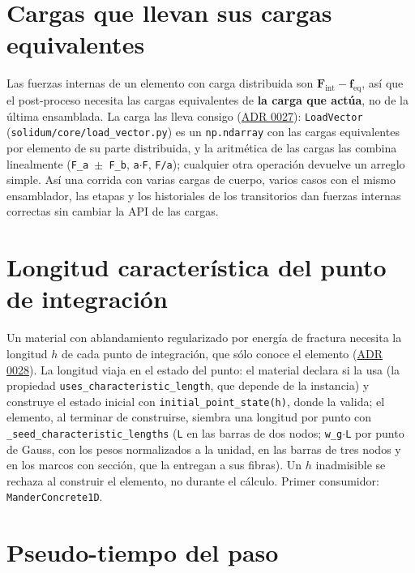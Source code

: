 \documentclass[11pt,oneside]{report}
\begin{document}
\section{Cargas que llevan sus cargas equivalentes}

Las fuerzas internas de un elemento con carga distribuida son $\mathbf F_\text{int} - \mathbf f_\text{eq}$, así que el post-proceso necesita las cargas equivalentes de \textbf{la carga que actúa}, no de la última ensamblada. La carga las lleva consigo (\hyperref[adr:0027]{ADR 0027}): \texttt{LoadVector} (\texttt{solidum/\allowbreak{}core/\allowbreak{}load\_\allowbreak{}vector.\allowbreak{}py}) es un \texttt{np.ndarray} con las cargas equivalentes por elemento de su parte distribuida, y la aritmética de las cargas las combina linealmente (\texttt{F\_a \ensuremath{\pm} F\_b}, \texttt{a\ensuremath{\cdot}F}, \texttt{F/a}); cualquier otra operación devuelve un arreglo simple. Así una corrida con varias cargas de cuerpo, varios casos con el mismo ensamblador, las etapas y los historiales de los transitorios dan fuerzas internas correctas sin cambiar la API de las cargas.

\section{Longitud característica del punto de integración}

Un material con ablandamiento regularizado por energía de fractura necesita la longitud $h$ de cada punto de integración, que sólo conoce el elemento (\hyperref[adr:0028]{ADR 0028}). La longitud viaja en el estado del punto: el material declara si la usa (la propiedad \texttt{uses\_\allowbreak{}characteristic\_\allowbreak{}length}, que depende de la instancia) y construye el estado inicial con \texttt{initial\_\allowbreak{}point\_\allowbreak{}state(h)}, donde la valida; el elemento, al terminar de construirse, siembra una longitud por punto con \texttt{\_\allowbreak{}seed\_\allowbreak{}characteristic\_\allowbreak{}lengths} (\texttt{L} en las barras de dos nodos; \texttt{w\_g\ensuremath{\cdot}L} por punto de Gauss, con los pesos normalizados a la unidad, en las barras de tres nodos y en los marcos con sección, que la entregan a sus fibras). Un $h$ inadmisible se rechaza al construir el elemento, no durante el cálculo. Primer consumidor: \texttt{ManderConcrete1D}.

\section{Pseudo-tiempo del paso}
\end{document}
